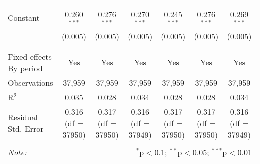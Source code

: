 \begin{table}[!htbp]
{\begin{tabular}{@{\extracolsep{5pt}}lcccccc}
    & & & & & & \\
   Constant & 0.260$^{***}$ & 0.276$^{***}$ & 0.270$^{***}$ & 0.245$^{***}$ & 0.276$^{***}$ & 0.269$^{***}$ \\
    & (0.005) & (0.005) & (0.005) & (0.005) & (0.005) & (0.005) \\
    & & & & & & \\
  \hline \\[-1.8ex]
  Fixed effects By period & Yes & Yes & Yes & Yes & Yes & Yes \\
  Observations & 37,959 & 37,959 & 37,959 & 37,959 & 37,959 & 37,959 \\
  R$^{2}$ & 0.035 & 0.028 & 0.034 & 0.028 & 0.028 & 0.034 \\
  Residual Std. Error & 0.316 (df = 37950) & 0.317 (df = 37950) & 0.316 (df = 37949) & 0.317 (df = 37950) & 0.317 (df = 37950) & 0.316 (df = 37949) \\
  \hline
  \hline \\[-1.8ex]
  \textit{Note:}  & \multicolumn{6}{r}{$^{*}$p$<$0.1; $^{**}$p$<$0.05; $^{***}$p$<$0.01} \\
  \end{tabular}

}

\end{table}

